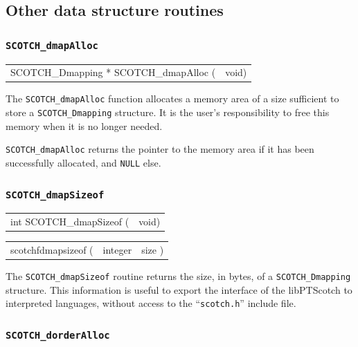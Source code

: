 \subsection{Other data structure routines}
\label{sec-lib-func-other}

\subsubsection{{\tt SCOTCH\_dmapAlloc}}

\begin{itemize}
\progsyn

{\tt\begin{tabular}{l@{}l}
SCOTCH\_Dmapping * SCOTCH\_dmapAlloc ( & void)
\end{tabular}}

\progdes

The {\tt SCOTCH\_dmapAlloc} function allocates a memory area of a
size sufficient to store a {\tt SCOTCH\_\lbt Dmapping} structure. It is
the user's responsibility to free this memory when it is no longer
needed.

\progret

{\tt SCOTCH\_dmapAlloc} returns the pointer to the memory area if it
has been successfully allocated, and {\tt NULL} else.
\end{itemize}

\subsubsection{{\tt SCOTCH\_dmapSizeof}}

\begin{itemize}
\progsyn

{\tt\begin{tabular}{l@{}l}
int SCOTCH\_dmapSizeof ( & void)
\end{tabular}}

{\tt\begin{tabular}{l@{}ll}
scotchfdmapsizeof ( & integer & size )
\end{tabular}}

\progdes

The {\tt SCOTCH\_dmapSizeof} routine returns the size, in bytes, of a
{\tt SCOTCH\_\lbt Dmapping} structure. This information is useful to
export the interface of the {\sc libPTScotch} to interpreted languages,
without access to the ``{\tt scotch.h}'' include file.
\end{itemize}

\subsubsection{{\tt SCOTCH\_dorderAlloc}}

